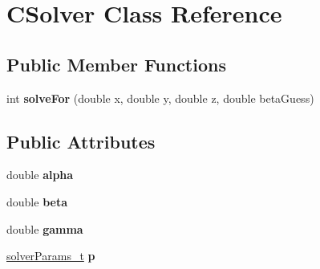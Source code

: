 \hypertarget{class_c_solver}{
\section{CSolver Class Reference}
\label{class_c_solver}
}
\subsection*{Public Member Functions}
\begin{DoxyCompactItemize}
\item 
\hypertarget{class_c_solver_aca6042942026c28c2f6be10262c0ba78}{
int {\bfseries solveFor} (double x, double y, double z, double betaGuess)}
\label{class_c_solver_aca6042942026c28c2f6be10262c0ba78}

\end{DoxyCompactItemize}
\subsection*{Public Attributes}
\begin{DoxyCompactItemize}
\item 
\hypertarget{class_c_solver_ae4b0cb7d3816df96dbe13f5d72d774e8}{
double {\bfseries alpha}}
\label{class_c_solver_ae4b0cb7d3816df96dbe13f5d72d774e8}

\item 
\hypertarget{class_c_solver_ae38e7395e178f46a89c91e9242efd92d}{
double {\bfseries beta}}
\label{class_c_solver_ae38e7395e178f46a89c91e9242efd92d}

\item 
\hypertarget{class_c_solver_a2ab708e6abe50055c465323e9252c952}{
double {\bfseries gamma}}
\label{class_c_solver_a2ab708e6abe50055c465323e9252c952}

\item 
\hypertarget{class_c_solver_afc79ae1d341859b276a2637ff6ed91e4}{
\hyperlink{struct_p_a_r_a_m_s}{solverParams\_\-t} {\bfseries p}}
\label{class_c_solver_afc79ae1d341859b276a2637ff6ed91e4}

\end{DoxyCompactItemize}
